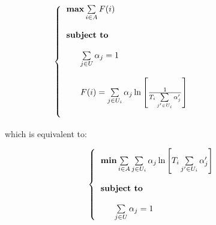 \documentclass[journal,transmag]{IEEEtran}
\begin{document}
\begin{footnotesize}
\begin{equation}
\left\{
\begin{tabular}{l} 
$\textbf{max}  \sum\limits_{i \in A} F(i) $ \\         
\\
\textbf{subject to} \\

\\
~~~~~$ \sum\limits_{j \in U} \alpha_j = 1 $ ~~~~~~~~~~~~~~~~~~~~~~ \\

\\
~~~~~$ F(i)= \sum\limits_{j \in U_i} \alpha_j \ln \left[ \frac{1}{T_i \sum\limits_{j'\in U_i} \alpha_j'} \right]     $ ~~~~~~~~~~~~~~~~~~~~~~ \\
\\

\end{tabular}
\right.
\end{equation}
\end{footnotesize}

which is equivalent to:\\

\begin{footnotesize}
\begin{equation}
\left\{
\begin{tabular}{l} 
$\textbf{min}  \sum\limits_{i \in A} \sum\limits_{j \in U_i} \alpha_j \ln \left[ T_i \sum\limits_{j'\in U_i} \alpha_j' \right] $ \\         
\\
\textbf{subject to} \\

\\
~~~~~$ \sum\limits_{j \in U} \alpha_j = 1 $ ~~~~~~~~~~~~~~~~~~~~~~ \\


\end{tabular}
\right.
\end{equation}
\end{footnotesize}
\end{document}

